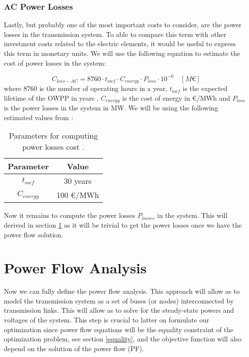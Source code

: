 \documentclass[a4paper,11pt, titlepage, twoside]{article}
\begin{document}
\subsubsection{AC Power Losses}
Lastly, but probably one of the most important costs to consider, are the power losses in the transmission system. To able to compare this term with other investment costs related to the electric elements,
it would be useful to express this term in monetary units. We will use the following equation to estimate the cost of power losses in the system:

\begin{equation}\label{eq:lossescost}
    C_{loss-AC} = 8760 \cdot t_{owf} \cdot C_{energy} \cdot P_{loss} \cdot 10^{-6} \quad \left[M\euro\right]
\end{equation}
where $8760$ is the number of operating hours in a year, $t_{owf}$ is the expected lifetime of the OWPP in years , $C_{energy}$ is the cost of energy in \euro/MWh and $P_{loss}$ is the power losses in the system in MW. We will be using the
following estimated values from \cite{paperbase}:
\begin{table}[h]
    \centering
    \begin{tabular}{c|c}
    \hline
    \textbf{Parameter} & \textbf{Value} \\
    \hline
    $t_{owf}$ & 30 years \\ 
    $C_{energy}$ & 100 \euro/MWh  \\
    \hline
    \end{tabular}
    \caption{Parameters for computing power losses cost \cite{paperbase}.}
    \label{tab:lossescost}
\end{table}

Now it remains to compute the power losses $P_{losses}$ in the system. This will derived in section \ref{fulltransmission} as it will be trivial to get
the power losses once we have the power flow solution.

\section{Power Flow Analysis} \label{fulltransmission}

Now we can fully define the power flow analysis.  This approach will allow as to model the transmission system as a set of buses (or nodes)
interconnected by transmission links. This will allow as to solve for the steady-state powers and voltages of the system. This step is crucial to latter on
formulate our optimization since power flow equations will be the equality constraint of the optimization problem,  see section \ref{equality}, and the objective function will also depend on the solution of the power flow (PF).
\end{document}
